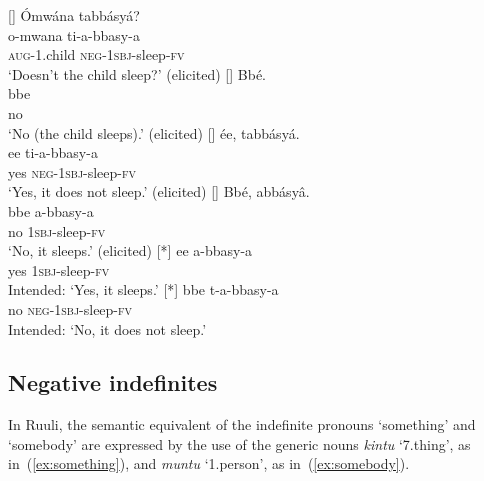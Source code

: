 \documentclass[output=paper,colorlinks,citecolor=brown,draftmode]{langscibook}
\begin{document}
\ea \label{ex:negreplies}\label{ex:ruulietal:31}
\begin{xlist}[A5: ]
[]{ \label{ex:question}
	\glll   Ómwána tabbásyá? \\
	        o-mwana ti-a-bbasy-a \\
	    	\textsc{aug}-1.child \textsc{neg}-\textsc{1sbj}-sleep-\textsc{fv} \\
	\glt ‘Doesn't the child sleep?' (elicited)} 
[]{\label{ex:question-answer1}
	\glll  Bbé.\\
	        bbe\\
	    	 no \\
	\glt `No (the child sleeps).' (elicited)} 
[]{ \label{ex:combination}
	\glll   ée, tabbásyá.\\
	        ee ti-a-bbasy-a\\
	    	yes \textsc{neg}-\textsc{1sbj}-sleep-\textsc{fv}\\
	\glt ‘Yes, it does not sleep.' (elicited)} 
[]{ \label{ex:combinationbbe}
	\glll   Bbé, abbásyâ.\\
	        bbe a-bbasy-a\\
            no \textsc{1sbj}-sleep-\textsc{fv} 
           \\
	\glt ‘No, it sleeps.'  (elicited)}
[*]{ \label{ex:combinationwrong}
	\gll  ee a-bbasy-a\\
		    yes \textsc{1sbj}-sleep-\textsc{fv} 
		   \\
	\glt Intended: `Yes, it sleeps.'}
[*]{\label{ex:combinationbbewrong}
	\gll  bbe t-a-bbasy-a\\
	    	no \textsc{neg}-\textsc{1sbj}-sleep-\textsc{fv}\\
	\glt Intended: `No, it does not sleep.'}
\end{xlist}
\z



\subsection{Negative indefinites} \label{sec:indefinitesruuli}

In Ruuli, the semantic equivalent of the indefinite pronouns `something' and `somebody' are expressed by the use of the generic nouns \textit{kintu} `7.thing', as in~(\ref{ex:something}), and \textit{muntu} `1.person', as in~(\ref{ex:somebody}). 
\end{document}
